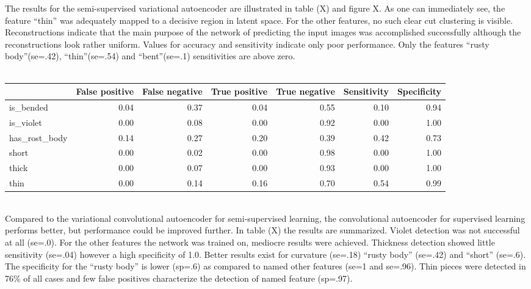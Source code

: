 The results for the semi-supervised variational autoencoder are illustrated in table (X) and figure X. As one can immediately see, the feature “thin” was adequately mapped to a decisive region in latent space. For the other features, no such clear cut clustering is visible. Reconstructions indicate that the main purpose of the network of predicting the input images was accomplished successfully although the reconstructions look rather uniform. Values for accuracy and sensitivity indicate only poor performance. Only the features “rusty body”(se=.42), “thin”(se=.54) and “bent”(se=.1) sensitivities are above zero. \\
\\

\begin{tabular}{lrrrrrr}
\toprule
{} &  False positive &  False negative &  True positive &  True negative &  Sensitivity &  Specificity \\
\midrule
is\_bended     &            0.04 &            0.37 &           0.04 &           0.55 &         0.10 &         0.94 \\
is\_violet     &            0.00 &            0.08 &           0.00 &           0.92 &         0.00 &         1.00 \\
has\_rost\_body &            0.14 &            0.27 &           0.20 &           0.39 &         0.42 &         0.73 \\
short         &            0.00 &            0.02 &           0.00 &           0.98 &         0.00 &         1.00 \\
thick         &            0.00 &            0.07 &           0.00 &           0.93 &         0.00 &         1.00 \\
thin          &            0.00 &            0.14 &           0.16 &           0.70 &         0.54 &         0.99 \\
\bottomrule
\end{tabular}
\\
Compared to the variational convolutional autoencoder for semi-supervised learning, the convolutional autoencoder for supervised learning performs better, but performance could be improved further. In table (X) the results are summarized. Violet detection was not successful at all (se=.0). For the other features the network was trained on, mediocre results were achieved. Thickness detection showed little sensitivity (se=.04) however a high specificity of 1.0. Better results exist for curvature (se=.18) “rusty body” (se=.42) and “short” (se=.6). The specificity for the “rusty body” is lower (sp=.6) as compared to named other features (se=1 and se=.96). Thin pieces were detected in 76\% of all cases and few false positives characterize the detection of named feature (sp=.97). \\
